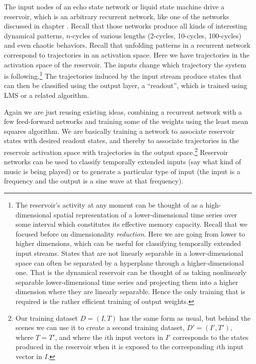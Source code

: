 
The input nodes of an echo state network or liquid state machine drive a reservoir, which is an arbitrary recurrent network, like one of the networks discussed in chapter . Recall that those networks produce all kinds of interesting dynamical patterns, \eg $n$-cycles of various lengths (2-cycles, 10-cycles, 100-cycles) and even chaotic behaviors. Recall that unfolding patterns in a recurrent network correspond to trajectories in an activation space. Here we have trajectories in the activation space of the reservoir. The inputs change which trajectory the system is following.\footnote{ The reservoir's activity at any moment can be thought of as a high-dimensional spatial representation of a lower-dimensional time series over some interval which constitutes its effective memory capacity. Recall that we focused before on dimensionality \emph{reduction}. Here we are going from lower to higher dimensions, which can be useful for classifying temporally extended input streams. States that are not linearly separable in a lower-dimensional space can often be separated by a hyperplane through a higher-dimensional one. That is the dynamical reservoir can be thought of as taking nonlinearly separable lower-dimensional time series and projecting them into a higher dimension where they are linearly separable. Hence the only training that is required is the rather efficient training of output weights.}  The trajectories induced by the input stream produce states that can then be classified using the output layer, a ``readout'', which is trained using LMS or a related algorithm.

Again we are just reusing existing ideas, combining a recurrent network with a few feed-forward networks and training some of the weights using the least mean squares algorithm. We are basically training a network to associate reservoir states with desired readout states, and thereby to associate trajectories in the reservoir activation space with trajectories in the output space.\footnote{Our training dataset $D=(I,T)$ has the same form as usual, but behind the scenes we can use it to create a second training dataset, $D'=(I',T')$, where $T=T'$, and where the $i$th input vectors in $I'$ corresponds to the states produced in the reservoir when it is exposed to the corresponding $i$th input vector in $I$.}  Reservoir networks can be used to classify temporally extended inputs (\eg say what kind of music is being played) or to generate a particular type of input (\eg the input is a frequency and the output is a sine wave at that frequency).

